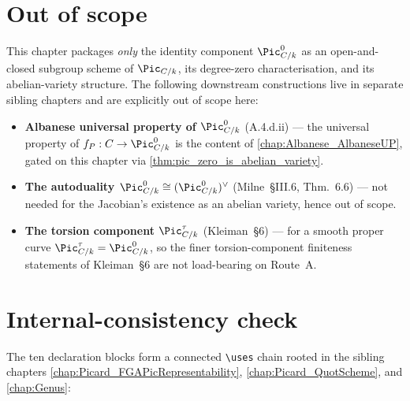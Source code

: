 \section{Out of scope}
\label{sec:pic0_out_of_scope}

This chapter packages \emph{only} the identity component
\(\Pic^0_{C/k}\) as an open-and-closed subgroup scheme of \(\Pic_{C/k}\),
its degree-zero characterisation, and its abelian-variety structure.
The following downstream constructions live in separate sibling
chapters and are explicitly out of scope here:

\begin{itemize}
  \item \textbf{Albanese universal property of \(\Pic^0_{C/k}\)}
    (A.4.d.ii) --- the universal property of \(f_P : C \to \Pic^0_{C/k}\)
    is the content of \cref{chap:Albanese_AlbaneseUP}, gated on this
    chapter via \cref{thm:pic_zero_is_abelian_variety}.
  \item \textbf{The autoduality \(\Pic^0_{C/k} \cong (\Pic^0_{C/k})^\vee\)}
    (Milne~\S III.6, Thm.~6.6) --- not needed for the Jacobian's
    existence as an abelian variety, hence out of scope.
  \item \textbf{The torsion component \(\Pic^\tau_{C/k}\)}
    (Kleiman~\S 6) --- for a smooth proper curve
    \(\Pic^\tau_{C/k} = \Pic^0_{C/k}\), so the finer torsion-component
    finiteness statements of Kleiman~\S 6 are not load-bearing on
    Route~A.
\end{itemize}

\section{Internal-consistency check}
\label{sec:pic0_consistency_check}

The ten declaration blocks form a connected \texttt{\textbackslash uses} chain rooted in
the sibling chapters \cref{chap:Picard_FGAPicRepresentability},
\cref{chap:Picard_QuotScheme}, and \cref{chap:Genus}:

